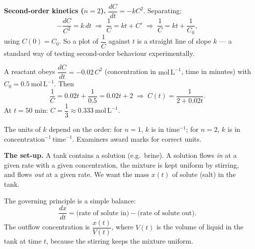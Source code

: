\documentclass[11pt]{article}
\newcounter{popsec}
\newcounter{popsub}
\newcommand{\courssub}[1]{%
  \stepcounter{popsub}%
  \par\vspace{9pt}\noindent{\popxbold\fontsize{11.5}{13}\selectfont\color{popink}{\color{poporange}\thepopsec.\thepopsub}\hspace{6pt}#1}\par\nopagebreak\vspace{4pt}
}
\begin{document}
\textbf{Second-order kinetics ($n=2$).} $\dfrac{dC}{dt}=-kC^{2}$. Separating:
\[
-\frac{dC}{C^{2}}=k\,dt
\;\Longrightarrow\;
\frac{1}{C}=kt+C'
\;\Longrightarrow\;
\frac{1}{C}=kt+\frac{1}{C_{0}},
\]
using $C(0)=C_{0}$. So a plot of $\dfrac{1}{C}$ against $t$ is a straight line of slope $k$ --- a standard way of testing second-order behaviour experimentally.

\begin{exemplebox}
A reactant obeys $\dfrac{dC}{dt}=-0.02\,C^{2}$ (concentration in $\mathrm{mol\,L^{-1}}$, time in minutes) with $C_{0}=0.5\ \mathrm{mol\,L^{-1}}$. Then
\[
\frac{1}{C}=0.02t+\frac{1}{0.5}=0.02t+2
\;\Longrightarrow\;
C(t)=\frac{1}{2+0.02t}.
\]
At $t=50$ min: $C=\dfrac{1}{3}\approx 0.333\ \mathrm{mol\,L^{-1}}$.
\end{exemplebox}

\begin{attention}
The units of $k$ depend on the order: for $n=1$, $k$ is in $\mathrm{time}^{-1}$; for $n=2$, $k$ is in $\mathrm{concentration}^{-1}\,\mathrm{time}^{-1}$. Examiners award marks for correct units.
\end{attention}

\courssub{Mixing Problems}

\textbf{The set-up.} A tank contains a solution (e.g.\ brine). A solution flows \emph{in} at a given rate with a given concentration, the mixture is kept uniform by stirring, and flows \emph{out} at a given rate. We want the mass $x(t)$ of solute (salt) in the tank.

The governing principle is a simple balance:
\[
\frac{dx}{dt}=\text{(rate of solute in)}-\text{(rate of solute out)}.
\]
The outflow concentration is $\dfrac{x(t)}{V(t)}$, where $V(t)$ is the volume of liquid in the tank at time $t$, because the stirring keeps the mixture uniform.
\end{document}
